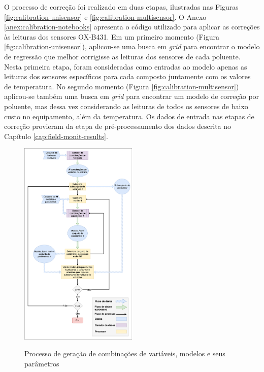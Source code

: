 O processo de correção foi realizado em duas etapas, ilustradas nas Figuras \ref{fig:calibration-unisensor} e \ref{fig:calibration-multisensor}. O Anexo \ref{anex:calibration-notebooks} apresenta o código utilizado para aplicar as correções às leituras dos sensores OX-B431. Em um primeiro momento (Figura \ref{fig:calibration-unisensor}), aplicou-se uma busca em \textit{grid} para encontrar o modelo de regressão que melhor corrigisse as leituras dos sensores de cada poluente. Nesta primeira etapa, foram consideradas como entradas ao modelo apenas as leituras dos sensores específicos para cada composto juntamente com os valores de temperatura. No segundo momento (Figura \ref{fig:calibration-multisensor}) aplicou-se também uma busca em \textit{grid} para encontrar um modelo de correção por poluente, mas dessa vez considerando as leituras de todos os sensores de baixo custo no equipamento, além da temperatura. Os dados de entrada nas etapas de correção provieram da etapa de pré-processamento dos dados descrita no Capítulo \ref{cap:field-monit-results}.

\begin{figure}[h!]
    \centering
    \caption{Processo de geração de combinações de variáveis, modelos e seus parâmetros}
    \includegraphics[width=0.5\textwidth]{chapters/4-CALIBRAÇÃO MÚLTIPLOS SENSORES/Figuras/Fluxograma busca em Grid.png}
    \label{fig:grid-search}
\end{figure}

